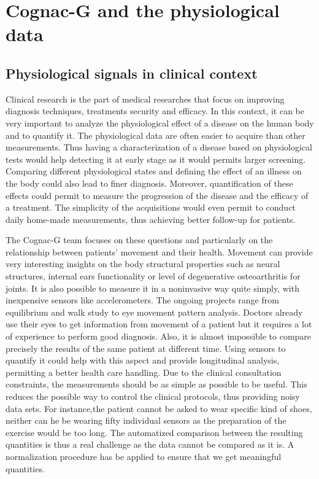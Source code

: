 \documentclass[../thesis.tex]{subfiles}
\begin{document}
\section{Cognac-G and the physiological data}
\label{sec:adaopt}


\subsection{Physiological signals in clinical context}

Clinical research is the part of medical researches that focus on improving diagnosis techniques, treatments security and efficacy. In this context, it can be very important to analyze the physiological effect of a disease on the human body and to quantify it. The physiological data are often easier to acquire than other measurements. Thus having a characterization of a disease based on physiological tests would help detecting it at early stage as it would permits larger screening. Comparing different physiological states and defining the effect of an illness on the body could also lead to finer diagnosis. Moreover, quantification of these effects could permit to measure the progression of the disease and the efficacy of a treatment. The simplicity of the acquisitions would even permit to conduct daily home-made measurements, thus achieving better follow-up for patients.

The Cognac-G team focuses on these questions and particularly on the relationship between patients' movement and their health. Movement can provide very interesting insights on the body structural properties such as neural structures, internal ears functionality or level of degenerative osteoarthritis for joints. It is also possible to measure it in a noninvasive way quite simply, with inexpensive sensors like accelerometers. The ongoing projects range from equilibrium and walk study to eye movement pattern analysis. Doctors already use their eyes to get information from movement of a patient but it requires a lot of experience to perform good diagnosis. Also, it is almost impossible to compare precisely the results of the same patient at different time. Using sensors to quantify it could help with this aspect and provide longitudinal analysis, permitting a better health care handling. Due to the clinical consultation constraints, the measurements should be as simple as possible to be useful. This reduces the possible way to control the clinical protocols, thus providing noisy data sets. For instance,the patient cannot be asked to wear specific kind of shoes, neither can he be wearing fifty individual sensors as the preparation of the exercise would be too long. The automatized comparison between the resulting quantities is thus a real challenge as the data cannot be compared as it is. A normalization procedure has be applied to ensure that we get meaningful quantities.
\end{document}
